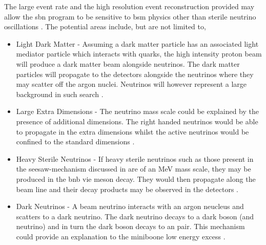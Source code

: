 The large event rate and the high resolution event reconstruction provided may allow the \gls{sbn} program to be sensitive to \gls{bsm} physics other than sterile neutrino oscillations \cite{SBN_paper}. The potential areas include, but are not limited to,
\begin{itemize}
    \item Light Dark Matter - Assuming a dark matter particle has an associated light mediator particle which interacts with quarks, the high intensity proton beam will produce a dark matter beam alongside neutrinos. The dark matter particles will propagate to the detectors alongside the neutrinos where they may scatter off the argon nuclei. Neutrinos will however represent a large background in such search \cite{SBN_paper}. 
    \item Large Extra Dimensions - The neutrino mass scale could be explained by the presence of additional dimensions. The right handed neutrinos would be able to propagate in the extra dimensions whilst the active neutrinos would be confined to the standard dimensions \cite{SBN_paper}. 
    \item Heavy Sterile Neutrinos - If heavy sterile neutrinos such as those present in the seesaw-mechanism discussed in  are of an MeV mass scale, they may be produced in the \gls{bnb} vie meson decay. They would then propagate along the beam line and their decay products may be observed in the detectors \cite{SBN_paper}\cite{MeV_scale_sterile_neutrino}.
    \item Dark Neutrinos - A beam neutrino interacts with an argon neucleus and scatters to a dark neutrino. The dark neutrino decays to a dark boson (and neutrino) and in turn the dark boson decays to an \positron \electron pair. This mechanism could provide an explanation to the \gls{miniboone} low energy excess \cite{SBN_paper}\cite{dark_neutrino}. 
\end{itemize}



            
            